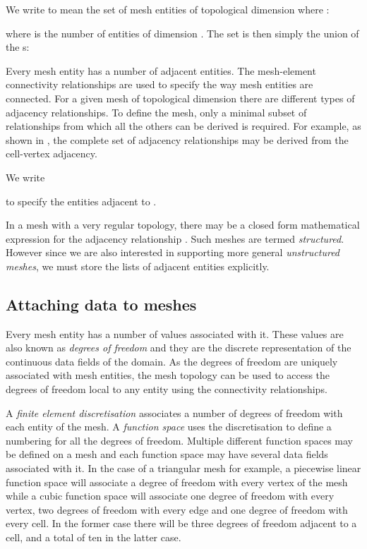 \documentclass[11pt, a4paper]{scrartcl}
\begin{document}
We write  to mean the set of mesh entities of topological
dimension  where :

where  is the number of entities of dimension . The set 
is then simply the union of the s:


Every mesh entity has a number of adjacent entities. The mesh-element
connectivity relationships are used to specify the way mesh entities
are connected. For a given mesh of topological dimension  there are
 different types of adjacency relationships. To define the
mesh, only a minimal subset of relationships from which all the others
can be derived is required.  For example, as shown in
\citet{Logg:2009}, the complete set of adjacency relationships may be
derived from the cell-vertex adjacency.

We write

to specify the entities  adjacent to
.

In a mesh with a very regular topology, there may be a closed form
mathematical expression for the adjacency relationship
. Such meshes are termed
\emph{structured}. However since we are also interested in supporting
more general \emph{unstructured meshes}, we must store the lists of
adjacent entities explicitly.

\subsection{Attaching data to meshes}
\label{ssec:mesh-data}

Every mesh entity has a number of values associated with it. These
values are also known as \emph{degrees of freedom} and they are the
discrete representation of the continuous data fields of the domain.
As the degrees of freedom are uniquely associated with mesh entities,
the mesh topology can be used to access the degrees of freedom local
to any entity using the connectivity relationships.

A \emph{finite element discretisation} associates a number of degrees
of freedom with each entity of the mesh. A \emph{function space} uses
the discretisation to define a numbering for all the degrees of
freedom. Multiple different function spaces may be defined on a mesh
and each function space may have several data fields associated with
it. In the case of a triangular mesh for example, a piecewise linear
function space will associate a degree of freedom with every vertex of
the mesh while a cubic function space will associate one degree of
freedom with every vertex, two degrees of freedom with every edge and
one degree of freedom with every cell. In the former case there will
be three degrees of freedom adjacent to a cell, and a total of ten in
the latter case.
\end{document}
